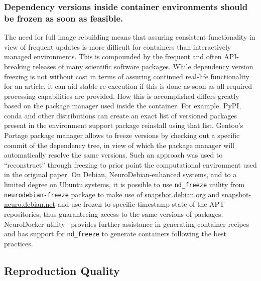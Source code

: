\subsubsection{Dependency versions inside container environments should be frozen as soon as feasible.}
The need for full image rebuilding means that assuring consistent functionality in view of frequent updates is more difficult for containers than interactively managed environments.
This is compounded by the frequent and often API-breaking releases of many scientific software packages.
While dependency version freezing is not without cost in terms of assuring continued real-life functionality for an article, it can aid stable re-execution if this is done as soon as all required processing capabilities are provided.
How this is accomplished differs greatly based on the package manager used inside the container.
For example, PyPI, conda and other distributions can create an exact list of versioned packages present in the environment support package reinstall using that list.
Gentoo's Portage package manager allows to freeze versions by checking out a specific commit of the dependency tree, in view of which the package manager will automatically resolve the same versions.
Such an approach was used to ``reconstruct'' through freezing to prior point the computational environment used in the original paper.
On Debian, NeuroDebian-enhanced systems, and to a limited degree on Ubuntu systems, it is possible to use \texttt{nd\_freeze} utility from \texttt{neurodebian-freeze} package to make use of \href{https://snapshot.debian.org}{snapshot.debian.org} and \href{http://snapshot-neuro.debian.net}{snapshot-neuro.debian.net} and use frozen to specific timestamp state of the APT repositories, thus guaranteeing access to the same versions of packages.
NeuroDocker utility~\cite{neurodocker} provides further assistance in generating container recipes and has support for \texttt{nd\_freeze} to generate containers following the best practices.


\subsection{Reproduction Quality}


